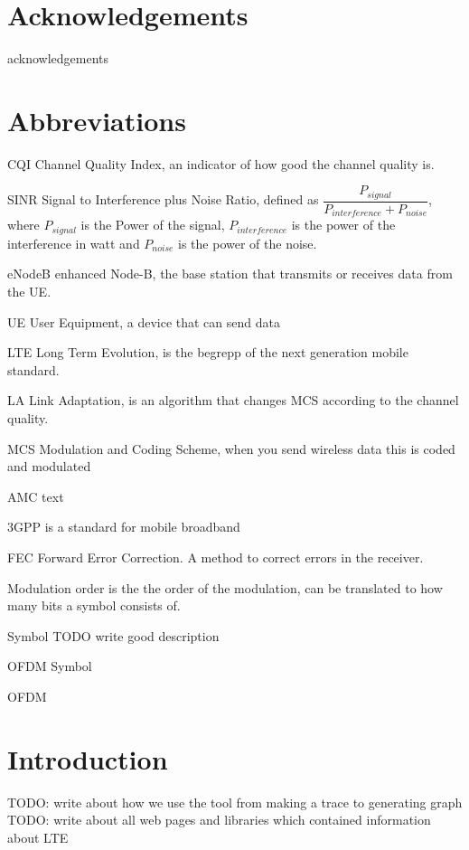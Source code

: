 \documentclass[cropmarks, frame, english]{idamasterthesis}
\author{Paul Nedstrand \& Razmus Lindgren}
\newcommand{\abbrlabel}[1]{\makebox[3cm][l]{\textbf{#1}\ \dotfill}}
\newenvironment{abbreviations}{\begin{list}{}{\renewcommand{\makelabel}{\abbrlabel}}}{\end{list}}
\begin{document}
\makeintropages

\chapter*{Acknowledgements}
acknowledgements 

\chapter*{Abbreviations}

 \begin{abbreviations}
\item[CQI] Channel Quality Index, an indicator of how good the channel quality is.
\item[SINR] Signal to Interference plus Noise Ratio, defined as $\dfrac{P_{signal}}{P_{interference} + P_{noise}}$, where $P_{signal}$ is the Power of the signal, $P_{interference}$ is the power of the interference in watt and $P_{noise}$ is the power of the noise.
\item[eNodeB] enhanced Node-B, the base station that transmits or receives data from the UE.
\item[UE] User Equipment, a device that can send data
\item[LTE] Long Term Evolution, is the begrepp of the next generation mobile standard.
\item[LA] Link Adaptation, is an algorithm that changes MCS according to the channel quality.
\item[MCS] Modulation and Coding Scheme, when you send wireless data this is coded and modulated
\item[AMC] text
\item[3GPP] is a standard for mobile broadband
\item[FEC] Forward Error Correction. A method to correct errors in the receiver.
\item[Modulation order] is the the order of the modulation, can be translated to how many bits a symbol consists of.
\item[Symbol] TODO write good description
\item[OFDM Symbol]
\item[OFDM]

\end{abbreviations}



\chapter{Introduction}
TODO: write about how we use the tool from making a trace to generating graph\\
TODO: write about all web pages and libraries which contained information about LTE
\end{document}
